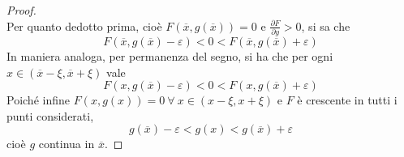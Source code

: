 \begin{proof}
\begin{equation}
       \end{equation}
       Per quanto dedotto prima, cioè $F(\overline{x}, g(\overline{x}))=0$ e $\frac{\partial{F}}{\partial{y}}>0$, si sa che 
       \begin{equation}
           F(\overline{x}, g(\overline{x})-\varepsilon)<0<F(\overline{x}, g(\overline{x})+\varepsilon)
       \end{equation}
       In maniera analoga, per permanenza del segno, si ha che per ogni $x \in (\overline{x}-\xi, \overline{x}+\xi)$ vale
       \begin{equation}
           F(x, g(\overline{x})-\varepsilon)<0<F(x, g(\overline{x})+\varepsilon)
       \end{equation}
       Poiché infine $F(x, g(x))=0\ \forall\ x \in (x-\xi, x+\xi)$ e $F$ è crescente in tutti i punti considerati,
       \begin{equation}
           g(\overline{x})- \varepsilon < g(x) < g(\overline{x})+\varepsilon
       \end{equation}
       cioè $g$ continua in $\overline{x}$.
       \end{proof}

